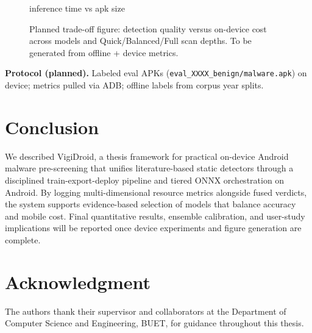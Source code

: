 \documentclass[conference]{IEEEtran}
\begin{document}
		\begin{figure}[H]
			\centerline{}
			\caption{inference time vs apk size}
			\label{fig:inference time vs apk size}
		\end{figure}
		
		
		
		
		
		\begin{figure}[H]
			\centerline{}
			\caption{Planned trade-off figure: detection quality versus on-device cost across models and Quick/Balanced/Full scan depths. To be generated from offline + device metrics.}
			\label{fig:tradeoff}
		\end{figure}
		\textbf{Protocol (planned).}
		Labeled eval APKs (\texttt{eval\_XXXX\_benign/malware.apk}) on device; metrics pulled via ADB; offline labels from corpus year splits.
		
		
		\section{Conclusion}
		We described VigiDroid, a thesis framework for practical on-device Android malware pre-screening that unifies literature-based static detectors through a disciplined train-export-deploy pipeline and tiered ONNX orchestration on Android.
		By logging multi-dimensional resource metrics alongside fused verdicts, the system supports evidence-based selection of models that balance accuracy and mobile cost.
		Final quantitative results, ensemble calibration, and user-study implications will be reported once device experiments and figure generation are complete.
		
		\section*{Acknowledgment}
		The authors thank their supervisor and collaborators at the Department of Computer Science and Engineering, BUET, for guidance throughout this thesis.
		
\end{document}
